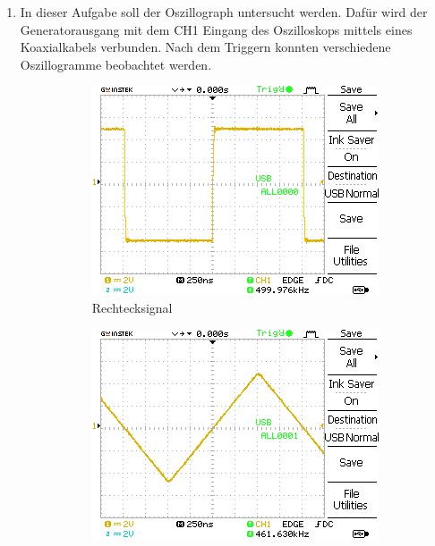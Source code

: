 \documentclass{article}
\begin{document}
     \begin{enumerate}[label=\alph*]
         \item In dieser Aufgabe soll der Oszillograph untersucht werden. Dafür wird der Generatorausgang mit dem CH1 Eingang des Oszilloskops mittels eines Koaxialkabels verbunden. Nach dem Triggern konnten verschiedene Oszillogramme beobachtet werden.
         
         \begin{figure}[H]
    \centering
    \begin{subfigure}[b]{0.48\textwidth}
        \centering
        \includegraphics[width=\textwidth]{MesswerteVersuch0/A0000DS.png}
        \caption{Rechtecksignal}
        \label{fig:A0000DS}
    \end{subfigure}
    \hfill
    \begin{subfigure}[b]{0.48\textwidth}
        \centering
        \includegraphics[width=\textwidth]{MesswerteVersuch0/A0001DS.png}

\end{subfigure}
\end{figure}
\end{enumerate}
\end{document}
